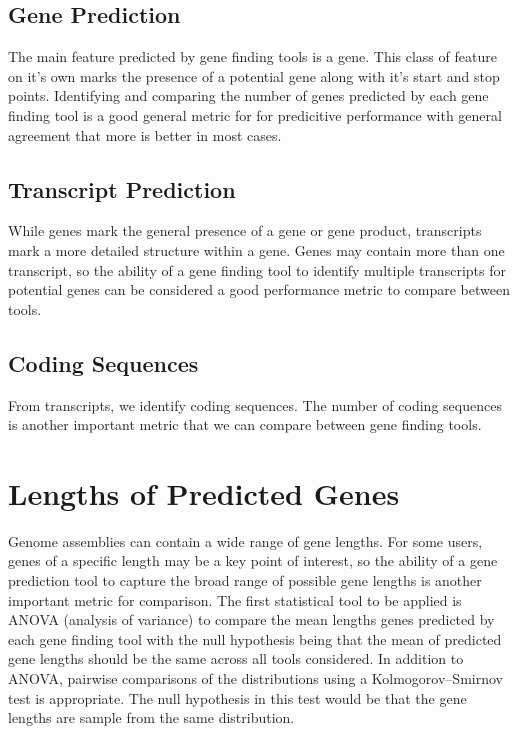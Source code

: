 \subsection{Gene Prediction}

The main feature predicted by gene finding tools is a gene. This class
of feature on it's own marks the presence of a potential gene along
with it's start and stop points. Identifying and comparing the number
of genes predicted by each gene finding tool is a good general metric
for for predicitive performance with general agreement that more is
better in most cases.

\subsection{Transcript Prediction}

While genes mark the general presence of a gene or gene product,
transcripts mark a more detailed structure within a gene. Genes may
contain more than one transcript, so the ability of a gene finding
tool to identify multiple transcripts for potential genes can be
considered a good performance metric to compare between tools.

\subsection{Coding Sequences}

From transcripts, we identify coding sequences. The number of coding
sequences is another important metric that we can compare between gene
finding tools.

\section{Lengths of Predicted Genes}

Genome assemblies can contain a wide range of gene lengths. For some
users, genes of a specific length may be a key point of interest, so
the ability of a gene prediction tool to capture the broad range of
possible gene lengths is another important metric for comparison. The
first statistical tool to be applied is ANOVA (analysis of variance)
to compare the mean lengths genes predicted by each gene finding tool
with the null hypothesis being that the mean of predicted gene lengths
should be the same across all tools considered. In addition to ANOVA,
pairwise comparisons of the distributions using a Kolmogorov–Smirnov
test is appropriate. The null hypothesis in this test would be that
the gene lengths are sample from the same distribution.

